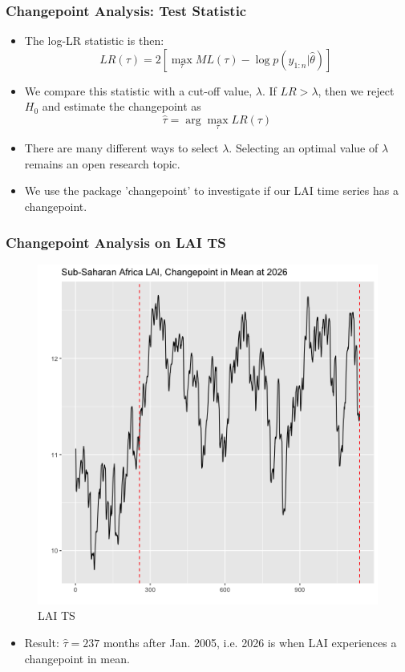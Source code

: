 \documentclass{beamer}
\begin{document}
\begin{frame}
	\frametitle{Changepoint Analysis: Test Statistic}
	\begin{itemize}
		\item The log-LR statistic is then: 
		\begin{equation*}
		LR(\tau)=2\left[\max_\tau ML(\tau)-\log p(y_{1:n}|\hat{\theta})\right]\
		\end{equation*}
		\item We compare this statistic with a cut-off value, $\lambda$. If $LR>\lambda$, then we reject $H_0$ and estimate the changepoint as 
		\begin{equation*}
		\hat{\tau}=\arg\max_\tau LR(\tau)
		\end{equation*}
		\item There are many different ways to select $\lambda$. Selecting an optimal value of $\lambda$ remains an open research topic.
		\item We use the package 'changepoint'
		to investigate if our LAI time series has a changepoint.
	\end{itemize}
\end{frame}

\begin{frame}
	\frametitle{Changepoint Analysis on LAI TS}
	\begin{figure}
	\centering
	\includegraphics[width=0.55\linewidth]{../img/changepoint_LAI.png}
	\caption{LAI TS}
	\end{figure}
	\begin{itemize}
		\item Result: $\hat{\tau}= 237$ months after Jan. 2005, i.e. 2026 is when LAI experiences a changepoint in mean.
	\end{itemize}
\end{frame}
\end{document}
